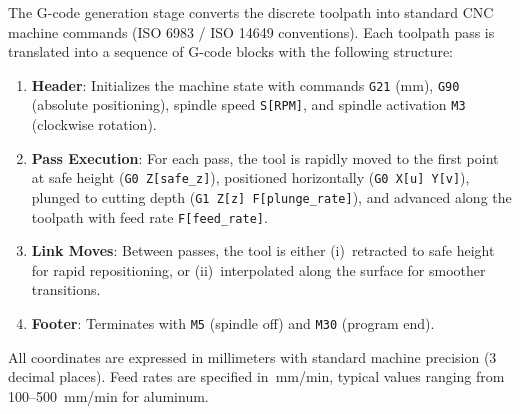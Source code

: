 \documentclass[a4paper,12pt]{article}
\begin{document}
The G-code generation stage converts the discrete toolpath into standard CNC
machine commands (ISO 6983 / ISO 14649 conventions). Each toolpath pass is
translated into a sequence of G-code blocks with the following structure:

\begin{enumerate}
  \item \textbf{Header}: Initializes the machine state with commands
    \texttt{G21} (mm), \texttt{G90} (absolute positioning), spindle speed
    \texttt{S[RPM]}, and spindle activation \texttt{M3} (clockwise rotation).

  \item \textbf{Pass Execution}: For each pass, the tool is rapidly moved to
    the first point at safe height (\texttt{G0 Z[safe\_z]}), positioned
    horizontally (\texttt{G0 X[u] Y[v]}), plunged to cutting depth
    (\texttt{G1 Z[z] F[plunge\_rate]}), and advanced along the toolpath with
    feed rate \texttt{F[feed\_rate]}.

  \item \textbf{Link Moves}: Between passes, the tool is either (i)~retracted
    to safe height for rapid repositioning, or (ii)~interpolated along the
    surface for smoother transitions.

  \item \textbf{Footer}: Terminates with \texttt{M5} (spindle off) and
    \texttt{M30} (program end).
\end{enumerate}

All coordinates are expressed in millimeters with standard machine precision
(3 decimal places). Feed rates are specified in~mm/min, typical values ranging
from 100--500~mm/min for aluminum.
\end{document}
